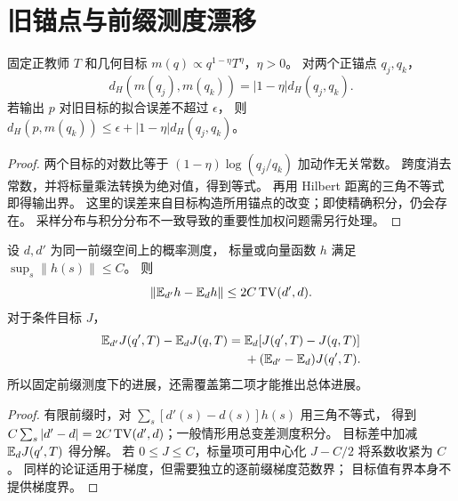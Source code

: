 \section{旧锚点与前缀测度漂移}
\begin{proposition}[旧锚点引起的目标偏移]
\label{prop:stale-anchor}
固定正教师 $T$ 和几何目标 $m(q)\propto q^{1-\eta}T^\eta$，$\eta>0$。
对两个正锚点 $q_j,q_k$，
\begin{equation}
d_H(m(q_j),m(q_k))=|1-\eta|d_H(q_j,q_k).
\end{equation}
若输出 $p$ 对旧目标的拟合误差不超过 $\epsilon$，
则 $d_H(p,m(q_k))\le\epsilon+|1-\eta|d_H(q_j,q_k)$。
\end{proposition}
\begin{proof}
两个目标的对数比等于
$(1-\eta)\log(q_j/q_k)$ 加动作无关常数。
跨度消去常数，并将标量乘法转换为绝对值，得到等式。
再用 Hilbert 距离的三角不等式即得输出界。
这里的误差来自目标构造所用锚点的改变；即使精确积分，仍会存在。
采样分布与积分分布不一致导致的重要性加权问题需另行处理。
\end{proof}

\begin{proposition}[前缀测度改变的值与梯度代价]
\label{prop:prefix-drift}
设 $d,d'$ 为同一前缀空间上的概率测度，
标量或向量函数 $h$ 满足 $\sup_s\|h(s)\|\le C$。
则
\begin{equation}
\|\mathbb E_{d'}h-\mathbb E_dh\|\le2C\operatorname{TV}(d',d).
\end{equation}
对于条件目标 $J$，
\begin{align}
\mathbb E_{d'}J(q',T)-\mathbb E_dJ(q,T)
={}&\mathbb E_d[J(q',T)-J(q,T)]\\
&+(\mathbb E_{d'}-\mathbb E_d)J(q',T).
\end{align}
所以固定前缀测度下的进展，还需覆盖第二项才能推出总体进展。
\end{proposition}
\begin{proof}
有限前缀时，对 $\sum_s[d'(s)-d(s)]h(s)$ 用三角不等式，
得到 $C\sum_s|d'-d|=2C\operatorname{TV}(d',d)$；一般情形用总变差测度积分。
目标差中加减 $\mathbb E_dJ(q',T)$ 得分解。
若 $0\le J\le C$，标量项可用中心化 $J-C/2$ 将系数收紧为 $C$。
同样的论证适用于梯度，但需要独立的逐前缀梯度范数界；
目标值有界本身不提供梯度界。
\end{proof}

